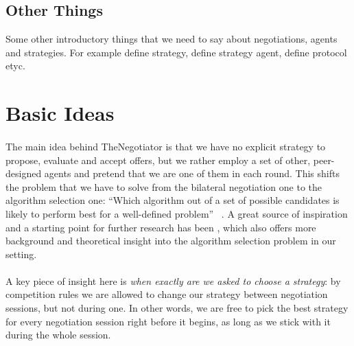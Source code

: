 \documentclass[12pt]{article}
\numberwithin{equation}{section}
\newcommand{\quotes}[1]{\textquotedblleft #1\textquotedblright \ }
\begin{document}


		\subsection{Other Things}	\label{sec:introduction.other_things}
			Some other introductory things that we need to say about negotiations, agents and strategies.
			For example define strategy, define strategy agent, define protocol etyc.

	\section{Basic Ideas}		\label{sec:basic_ideas}

		\paragraph*{}
			The main idea behind TheNegotiator is that we have no explicit strategy to propose, evaluate and accept offers, but we rather employ a set of other, peer-designed agents and pretend that we are one of them in each round. %
			This shifts the problem that we have to solve from the bilateral negotiation one to the algorithm selection one: \quotes{Which algorithm out of a set of possible candidates is likely to perform best for a well-defined problem} \cite{original_alg_selection_paper_1975}. A great source of inspiration and a starting point for further research has been \cite{meta_agent_paper}, which also offers more background and theoretical insight into the algorithm selection problem in our setting.
			
		\paragraph*{}
			A key piece of insight here is \emph{when exactly are we asked to choose a strategy}: by competition rules we are allowed to change our strategy between negotiation sessions, but not during one.
			In other words, we are free to pick the best strategy for every negotiation session right before it begins, as long as we stick with it during the whole session.
		
\end{document}
